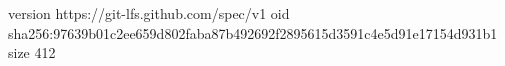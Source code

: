 version https://git-lfs.github.com/spec/v1
oid sha256:97639b01c2ee659d802faba87b492692f2895615d3591c4e5d91e17154d931b1
size 412
